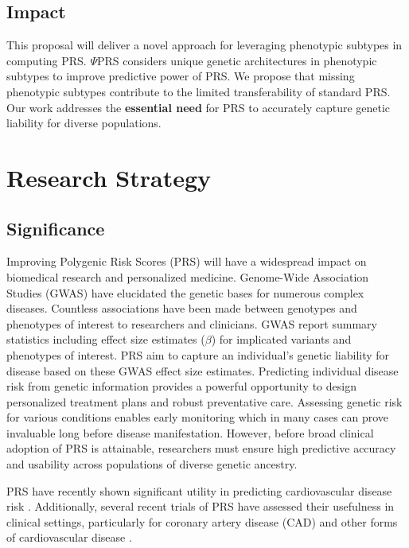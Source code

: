 \documentclass[11pt]{article}  %
\begin{document}
\subsection*{Impact}
This proposal will deliver a novel approach for leveraging phenotypic subtypes in computing PRS. $\Psi$PRS considers unique genetic architectures in phenotypic subtypes to improve predictive power of PRS. We propose that missing phenotypic subtypes contribute to the limited transferability of standard PRS. Our work addresses the \textbf{essential need} for PRS to accurately capture genetic liability for diverse populations.         

\newpage
\section*{Research Strategy}

\subsection*{Significance}
Improving Polygenic Risk Scores (PRS) will have a widespread impact on biomedical research and personalized medicine. Genome-Wide Association Studies (GWAS) have elucidated the genetic bases for numerous complex diseases. Countless associations have been made between genotypes and phenotypes of interest to researchers and clinicians. GWAS report summary statistics including effect size estimates ($\beta$) for implicated variants and phenotypes of interest. PRS aim to capture an individual's genetic liability for disease based on these GWAS effect size estimates. Predicting individual disease risk from genetic information provides a powerful opportunity to design personalized treatment plans and robust preventative care. Assessing genetic risk for various conditions enables early monitoring which in many cases can prove invaluable long before disease manifestation. However, before broad clinical adoption of PRS is attainable, researchers must ensure high predictive accuracy and usability across populations of diverse genetic ancestry.

PRS have recently shown significant utility in predicting cardiovascular disease risk \cite{sun_polygenic_2021}. Additionally, several recent trials of PRS have assessed their usefulness in clinical settings, particularly for coronary artery disease (CAD) and other forms of cardiovascular disease \cite{levin_michael_g_polygenic_2020}.

\end{document}
